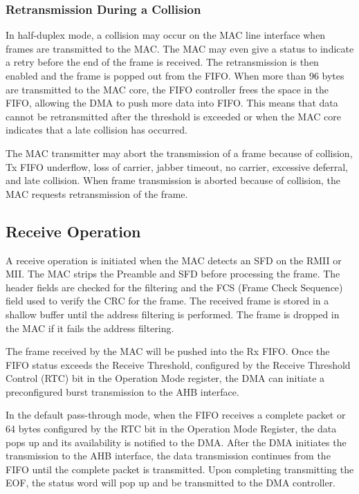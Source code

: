 \documentclass[main\_\_EN.tex]{subfiles}
\begin{document}
\subsubsection{Retransmission During a Collision}
\label{section:Retransmission During a Collision}
In half-duplex mode, a collision may occur on the MAC line interface when frames are transmitted to the MAC. The MAC may even give a status to indicate a retry before the end of the frame is received. The retransmission is then enabled and the frame is popped out from the FIFO. When more than 96 bytes are transmitted to the MAC core, the FIFO controller frees the space in the FIFO, allowing the DMA to push more data into FIFO. This means that data cannot be retransmitted after the threshold is exceeded or when the MAC core indicates that a late collision has occurred.

The MAC transmitter may abort the transmission of a frame because of collision, Tx FIFO underflow, loss of carrier, jabber timeout, no carrier, excessive deferral, and late collision. When frame transmission is aborted because of collision, the MAC requests retransmission of the frame.


\subsection{Receive Operation}
A receive operation is initiated when the MAC detects an SFD on the RMII or MII. The MAC strips the Preamble and SFD before processing the frame. The header fields are checked for the filtering and the FCS (Frame Check Sequence) field used to verify the CRC for the frame. The received frame is stored in a shallow buffer until the address filtering is performed. The frame is dropped in the MAC if it fails the address filtering.

The frame received by the MAC will be pushed into the Rx FIFO. Once the FIFO status exceeds the Receive Threshold, configured by the Receive Threshold Control (RTC) bit in the Operation Mode register, the DMA can initiate a preconfigured burst transmission to the AHB interface.

In the default pass-through mode, when the FIFO receives a complete packet or 64 bytes configured by the RTC bit in the Operation Mode Register, the data pops up and its availability is notified to the DMA. After the DMA initiates the transmission to the AHB interface, the data transmission continues from the FIFO until the complete packet is transmitted. Upon completing transmitting the EOF, the status word will pop up and be transmitted to the DMA controller.
\end{document}
